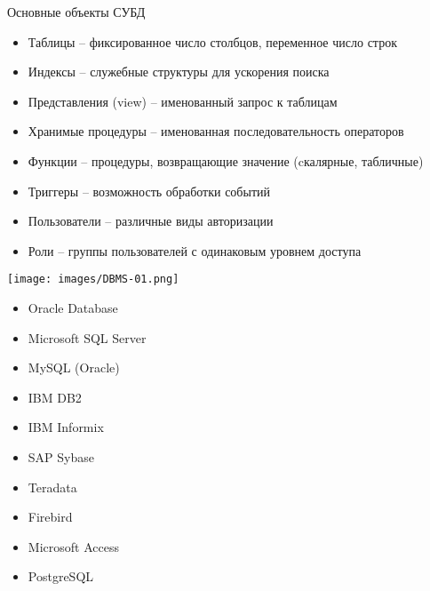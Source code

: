 \documentclass{beamer}
\begin{document}
\begin{frame}{Основные объекты СУБД}
	\begin{itemize}
		\item Таблицы – фиксированное число столбцов, переменное число строк
		\item Индексы – служебные структуры для ускорения поиска
		\item Представления (view) – именованный запрос к таблицам
		\item Хранимые процедуры – именованная последовательность операторов
		\item Функции – процедуры, возвращающие значение (cкалярные, табличные)
		\item Триггеры – возможность обработки событий
		\item Пользователи – различные виды авторизации
		\item Роли – группы пользователей с одинаковым уровнем доступа
	\end{itemize}
\end{frame} 

\begin{frame}
\begin{minipage}{0.4\textwidth}
  \begin{flushleft}
	\begin{center}
		\texttt{[image: images/DBMS-01.png]}
	\end{center}
  \end{flushleft}
\end{minipage}
\begin{minipage}{0.4\textwidth}
  \begin{flushright}
  	\begin{itemize}
		\item Oracle Database
		\item Microsoft SQL Server
		\item MySQL (Oracle)
		\item IBM DB2
		\item IBM Informix
		\item SAP Sybase
		\item Teradata
		\item Firebird
		\item Microsoft Access
		\item PostgreSQL
  	\end{itemize}
  \end{flushright}
\end{minipage}
\end{frame}
\end{document}
